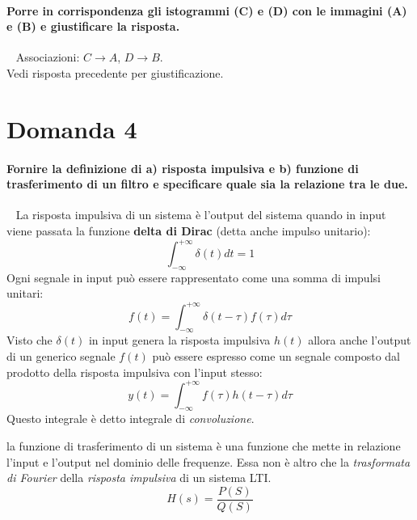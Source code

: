 \documentclass[a4paper,oneside]{scrbook}
\begin{document}
\paragraph{Porre in corrispondenza gli istogrammi (C) e (D) con le immagini (A) e (B) e giustificare la risposta.}\
\newline
Associazioni: $C \rightarrow A$, $D \rightarrow B$.\\
Vedi risposta precedente per giustificazione.

\section*{Domanda 4}
\paragraph{Fornire la definizione di a) risposta impulsiva e b) funzione di trasferimento di un filtro e specificare quale sia la relazione tra le due.}\
\newline
La risposta impulsiva di un sistema è l'output del sistema quando in input viene passata la funzione \textbf{delta di Dirac} (detta anche impulso unitario):
\begin{equation*}
	\int_{-\infty}^{+\infty} \delta(t)dt=1
\end{equation*}
Ogni segnale in input può essere rappresentato come una somma di impulsi unitari:
\begin{equation*}
	f(t)=\int_{-\infty}^{+\infty} \delta(t-\tau)f(\tau)d\tau
\end{equation*}
Visto che $\delta(t)$ in input genera la risposta impulsiva $h(t)$ allora anche l'output di un generico segnale $f(t)$ può essere espresso come un segnale
composto dal prodotto della risposta impulsiva con l'input stesso:
\begin{equation*}
	y(t)=\int_{-\infty}^{+\infty}f(\tau)h(t-\tau)d\tau
\end{equation*}
Questo integrale è detto integrale di \textit{convoluzione}.

la funzione di trasferimento di un sistema è una funzione che mette in relazione l'input e l'output nel dominio delle frequenze. Essa non è altro che la
\textit{trasformata di Fourier} della \textit{risposta impulsiva} di un sistema LTI.
\begin{equation*}
	H(s)=\frac{P(S)}{Q(S)}
\end{equation*}
\end{document}
